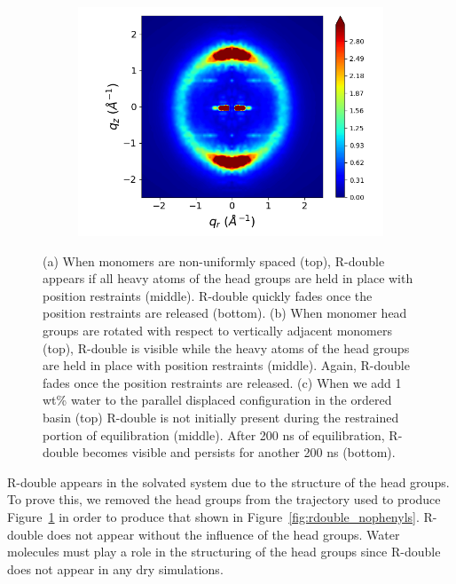 \documentclass[journal=jpcbfk,manusciprt=article]{achemso}
\begin{document}
\begin{figure}[!htb]
\begin{subfigure}{0.3\linewidth}
  \end{subfigure}
  \begin{subfigure}{0.3\linewidth}
  	\centering
  	\includegraphics[width=\textwidth]{solvated_offset_rzplot_1.png}
  	\caption{}\label{fig:solvated_pore_rzplot_norestraints}
  \end{subfigure}
  \caption{(a) When monomers are non-uniformly spaced (top), R-double appears if all heavy atoms
  of the head groups are held in place with position restraints (middle). R-double quickly fades once 
  the position restraints are released (bottom). (b) When monomer head groups are rotated with respect
  to vertically adjacent monomers (top), R-double is visible while the heavy atoms of the head groups
  are held in place with position restraints (middle). Again, R-double fades once the position 
  restraints are released. (c) When we add 1 wt\% water to the parallel displaced configuration in the
  ordered basin (top) R-double is not initially present during the restrained portion of equilibration (middle).
  After 200 ns of equilibration, R-double becomes visible and persists for another 200 ns (bottom).}\label{fig:rdouble}
  \end{figure}

  R-double appears in the solvated system due to the structure of the head groups. To prove this,
  we removed the head groups from the trajectory used to produce Figure~\ref{fig:solvated_pore_rzplot_norestraints}
  in order to produce that shown in Figure~\ref{fig:rdouble_nophenyls}. R-double does not appear
  without the influence of the head groups. Water molecules must play a role in the structuring
  of the head groups since R-double does not appear in any dry simulations.
\end{document}
